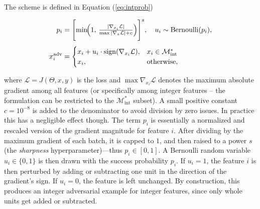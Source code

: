 The scheme is defined in Equation (\ref{eq:intprob})

\begin{equation}
\begin{aligned}
p_i &= \Biggl[\min\!\Bigl(1,\,
          \tfrac{|\nabla_{x_i}\mathcal{L}|}{\max|\nabla_{x}\mathcal{L}|+c}\Bigr)\Biggr]^{s}, \quad
u_i \sim \operatorname{Bernoulli}(p_i), \\[4pt]
x_i^{\text{adv}} &= 
    \begin{cases} 
    x_i + u_i\cdot \operatorname{sign}(\nabla_{x_i} \mathcal{L}), & x_i\in\mathcal{M}_{\text{int}}^* \\
    x_i, & \text{otherwise},
    \end{cases}
\end{aligned}
\label{eq:intprob}
\end{equation}

where $\mathcal{L}=J(\Theta,x,y)$ is the loss and $\max{\nabla_{x_i} \mathcal{L}}$ denotes the maximum absolute gradient among all features (or specifically among integer features – the formulation can be restricted to the $\mathcal{M}_{\text{int}}^*$ subset). A small positive constant $c=10^{-8}$ is added to the denominator to avoid division by zero issues. In practice this has a negligible effect though. The term $p_i$ is essentially a normalized and rescaled version of the gradient magnitude for feature $i$. After dividing by the maximum gradient of each batch, it is capped to $1$, and then raised to a power $s$ (the \textit{sharpness} hyperparameter)—thus $p_i \in [0,1]$. A Bernoulli random variable $u_i\in\{0,1\}$ is then drawn with the success probability $p_i$. If $u_i=1$, the feature $i$ is then perturbed by adding or subtracting one unit in the direction of the gradient's sign. If $u_i=0$, the feature is left unchanged. By construction, this produces an integer adversarial example for integer features, since only whole units get added or subtracted.

